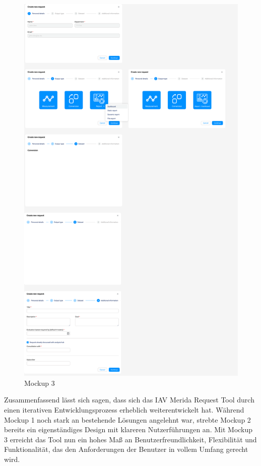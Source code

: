 \begin{figure}[H]
    \centering
    \includegraphics[scale=.2]{media/MockUps3.0}
    \caption{Mockup 3}
    \label{fig:MockUps3.0}
\end{figure}
Zusammenfassend lässt sich sagen, dass sich das IAV Merida Request Tool durch einen iterativen Entwicklungsprozess erheblich weiterentwickelt hat. Während Mockup 1 noch stark an bestehende Lösungen angelehnt war, strebte Mockup 2 bereits ein eigenständiges Design mit klareren Nutzerführungen an. Mit Mockup 3 erreicht das Tool nun ein hohes Maß an Benutzerfreundlichkeit, Flexibilität und Funktionalität, das den Anforderungen der Benutzer in vollem Umfang gerecht wird.
\label{chap:kapitel5}